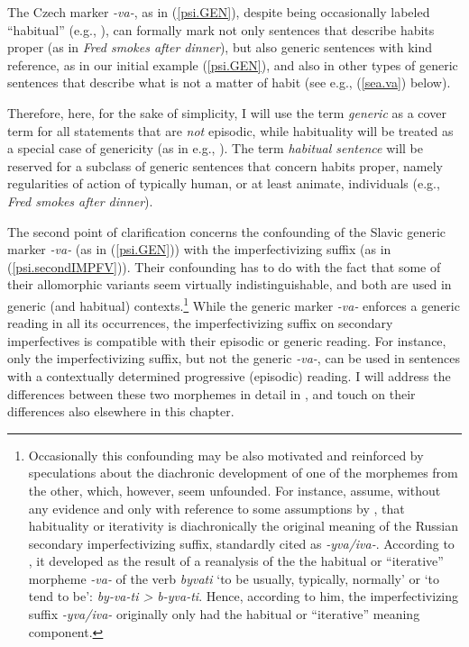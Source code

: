 \documentclass[output=paper,colorlinks,citecolor=brown]{langscibook}
\begin{document}
The Czech marker \textit{-va-}, as in (\ref{psi.GEN}),
despite being occasionally labeled ``habitual'' (e.g., \citealt{dahl1995,danaher2003semantics,karlik2017}),
can formally mark not only sentences that describe habits proper
(as in \textit{Fred smokes after dinner}), 
but also generic sentences with kind reference, as in our initial example (\ref{psi.GEN}), and also in other types of generic sentences that describe what is not a matter of habit (see e.g., (\ref{sea.va}) below). 

Therefore, here, for the sake of simplicity, I will use the term \textit{generic} as a cover term for all statements that are \textit{not} episodic, while habituality 
will be treated as a special case of genericity (as in e.g., \citealt{krifka1995genericity}). The term \textit{habitual sentence} 
will be reserved for a subclass of generic sentences that concern habits proper, namely regularities of action of typically human, or at least animate, individuals (e.g., \textit{Fred smokes after dinner}). 

The second point of clarification concerns the confounding of the Slavic generic marker \textit{-va-} (as in (\ref{psi.GEN})) with the imperfectivizing suffix (as in (\ref{psi.secondIMPFV})). 
Their confounding has to do with the fact that
some of their allomorphic variants seem 
virtually indistinguishable, and both are used in generic (and habitual) contexts.\footnote{Occasionally this confounding may be also motivated
and reinforced by speculations about the diachronic 
development of one of the morphemes
from the other, which, however, seem unfounded. For instance, \citet{Kuznetsova2016} assume, without any evidence and only
with reference to some assumptions by \citet{kuznecov1953},
that habituality or iterativity is diachronically the original meaning of the Russian secondary imperfectivizing suffix, standardly cited as \textit{-yva/iva-}. According to \citet[259]{kuznecov1953},
it developed as the result of a reanalysis of the 
the habitual or ``iterative'' morpheme \textit{-va-} of the verb \textit{byvati} `to be usually, typically, normally' or `to tend to be':
\textit{by-va-ti > b-yva-ti}. Hence, according to him, the imperfectivizing suffix \textit{-yva/iva-} originally only had the habitual or ``iterative'' meaning component.}
While the generic marker \textit{-va-} enforces a generic reading in all its occurrences, the imperfectivizing suffix
on secondary imperfectives is compatible with their
episodic or generic reading. 
For instance, only the imperfectivizing suffix, but not the generic \textit{-va-}, can be used in 
sentences with a contextually determined progressive (episodic) reading. 
I will address the differences between these two
morphemes in detail in ,
and touch on their differences also elsewhere in this chapter. 
\end{document}
